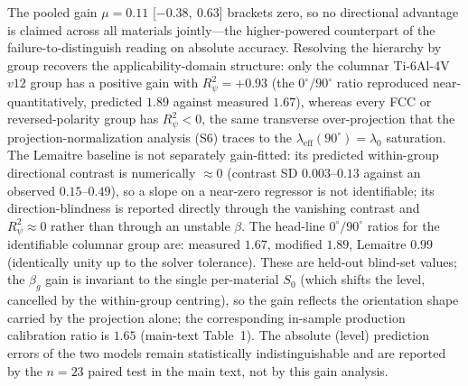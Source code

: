 \documentclass[11pt,a4paper,twocolumn]{article}
\providecommand{\ang}[1]{\ensuremath{#1^{\circ}}}
\begin{document}
The pooled gain $\mu=0.11$ [$-0.38,\ 0.63$] brackets zero, so no directional advantage is claimed across all materials jointly---the higher-powered counterpart of the failure-to-distinguish reading on absolute accuracy. Resolving the hierarchy by group recovers the applicability-domain structure: only the columnar Ti-6Al-4V $v12$ group has a positive gain with $R^2_\psi=+0.93$ (the $\ang{0}/\ang{90}$ ratio reproduced near-quantitatively, predicted $1.89$ against measured $1.67$), whereas every FCC or reversed-polarity group has $R^2_\psi<0$, the same transverse over-projection that the projection-normalization analysis (S6) traces to the $\lambda_{\mathrm{eff}}(\ang{90})=\lambda_0$ saturation. The Lemaitre baseline is not separately gain-fitted: its predicted within-group directional contrast is numerically $\approx0$ (contrast SD $0.003$--$0.13$ against an observed $0.15$--$0.49$), so a slope on a near-zero regressor is not identifiable; its direction-blindness is reported directly through the vanishing contrast and $R^2_\psi\approx0$ rather than through an unstable $\beta$. The head-line $\ang{0}/\ang{90}$ ratios for the identifiable columnar group are: measured $1.67$, modified $1.89$, Lemaitre $0.99$ (identically unity up to the solver tolerance). These are held-out blind-set values; the $\beta_g$ gain is invariant to the single per-material $S_0$ (which shifts the level, cancelled by the within-group centring), so the gain reflects the orientation shape carried by the projection alone; the corresponding in-sample production calibration ratio is $1.65$ (main-text Table~1). The absolute (level) prediction errors of the two models remain statistically indistinguishable and are reported by the $n=23$ paired test in the main text, not by this gain analysis.
\end{document}

